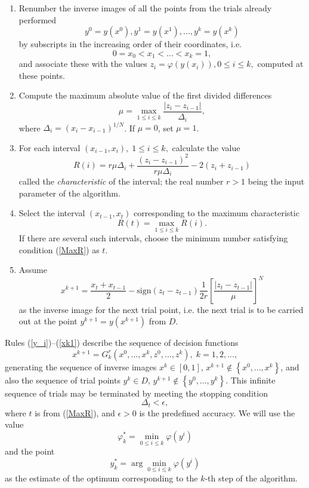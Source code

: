 \documentclass[smallcondensed]{svjour3}     %
\begin{document}
\begin{enumerate}
	\item 
	Renumber the inverse images of all the points from the trials already performed  
\begin{equation}\label{y_i}
y^0=y(x^0), y^1=y(x^1),...,y^k=y(x^k)
\end{equation}
by subscripts in the increasing order of their coordinates, i.e.
\begin{equation}\label{x_i}
0=x_0<x_1<\dots <x_k=1,
\end{equation}
and associate these with the values $z_i=\varphi(y(x_i)), 0\leq i \leq k,$  computed at these points.
\item
Compute the maximum absolute value of the first divided differences
\begin{equation}\label{mu}
\mu = \max_{1 \leq i \leq k}\frac{\left|z_i-z_{i-1}\right|}{\Delta_i},
\end{equation}
where $\Delta_i=\left(x_i-x_{i-1}\right)^{1/N}$. If $\mu = 0$, set $\mu = 1$.
\item
For each interval $(x_{i-1}, x_i), \; 1\leq i \leq k,$  calculate the value
\begin{equation}\label{R}
R(i)=r\mu\Delta_i+\frac{(z_i-z_{i-1})^2}{r\mu\Delta_i}-2(z_i+z_{i-1})
\end{equation}
called the \textit{characteristic} of the interval; the real number $r>1$ being the input parameter of the algorithm.
\item 
Select the interval $(x_{t-1},x_t)$ corresponding to the maximum characteristic
\begin{equation}\label{MaxR}
R(t)= \max_{1 \leq i \leq k}R(i).
\end{equation}
If there are several such intervals, choose the minimum number satisfying condition (\ref{MaxR}) as $t$.
\item
Assume
\begin{equation}\label{xk1}
x^{k+1} = \frac{x_t+x_{t-1}}{2} - \mathrm{sign}(z_t-z_{t-1})\frac{1}{2r}\left[\frac{\left|z_t-z_{t-1}\right|}{\mu}\right]^N
\end{equation}
as the inverse image for the next trial point, i.e. the next trial is to be carried out at the point $y^{k+1}=y(x^{k+1})$ from $D$.
\end{enumerate}

Rules (\ref{y_i})--(\ref{xk1}) describe the sequence of decision functions 
\[
x^{k+1}=G_k^r(x^0,...,x^k,z^0,...,z^k), \; k=1,2,...,
\]
generating the sequence of inverse images $x^k\in[0,1]$, $x^{k+1} \notin \left\{x^0,...,x^k\right\}$, and also the sequence of trial points $y^k\in D$, $y^{k+1} \notin \left\{y^0,...,y^k\right\}$. This infinite sequence of trials may be terminated by meeting the stopping condition
\[
\Delta_t < \epsilon,
\]
where $t$ is from (\ref{MaxR}), and $\epsilon>0$ is the predefined accuracy. We will use the value
\[
\varphi_k^\ast=\min_{0\leq i \leq k}\varphi(y^i)
\]
and the point 
\[
y_k^\ast=\arg \min_{0\leq i \leq k}\varphi(y^i)
\]
as the estimate of the optimum corresponding to the $k$-th step of the algorithm.
\end{document}
